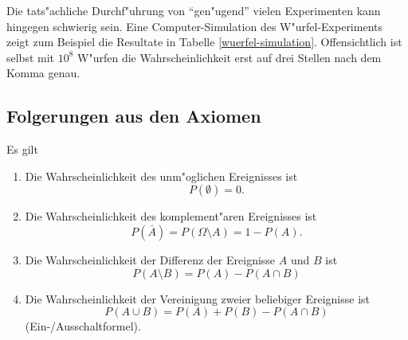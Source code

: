 Die tats"achliche Durchf"uhrung von ``gen"ugend'' vielen Experimenten
kann hingegen schwierig sein.
Eine Computer-Simulation des
W"urfel-Experiments zeigt zum Beispiel die Resultate in Tabelle
\ref{wuerfel-simulation}.
Offensichtlich ist selbst mit $10^8$
W"urfen die Wahrscheinlichkeit erst auf drei Stellen nach dem Komma
genau.

\subsection{Folgerungen aus den Axiomen}
\begin{satz}Es gilt
\begin{enumerate}
\item Die Wahrscheinlichkeit des unm"oglichen Ereignisses ist
\begin{equation}
P(\emptyset) = 0.
\label{p-emptyset}
\end{equation}
\item Die Wahrscheinlichkeit des komplement"aren Ereignisses
ist
\begin{equation}
P(\bar A) = P(\Omega\setminus A) = 1 -P(A).
\label{p-negation}
\end{equation}
\item Die Wahrscheinlichkeit der Differenz der Ereignisse $A$ und $B$
ist
\begin{equation}
P(A\setminus B) = P(A) - P(A\cap B)
\label{p-complement} %
\end{equation}
\item Die Wahrscheinlichkeit der Vereinigung zweier beliebiger Ereignisse
ist
\begin{equation}
P(A\cup B) = P(A) + P(B) - P(A\cap B)
\label{p-union}
\end{equation}
(Ein-/Ausschaltformel).
\end{enumerate}
\end{satz}


